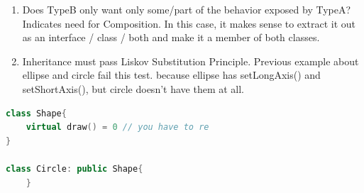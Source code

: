 \documentclass[a4paper,11pt,twoside]{book}
\begin{document}
\begin{itemize}
\begin{enumerate}
		\item Does TypeB only want only some/part of the behavior exposed by TypeA? Indicates need for Composition. In this case, it makes sense to extract it out as an interface / class / both and make it a member of both classes.
		
		\item Inheritance must pass Liskov Substitution Principle. Previous example about ellipse and circle fail this test. because ellipse has setLongAxis() and setShortAxis(), but circle doesn't have them at all.
	\end{enumerate}

\begin{lstlisting}[frame=single, language=c++]
class Shape{
	virtual draw() = 0 // you have to re
}
	
class Circle: public Shape{
	}
\end{lstlisting}


\end{itemize}
\end{document}
